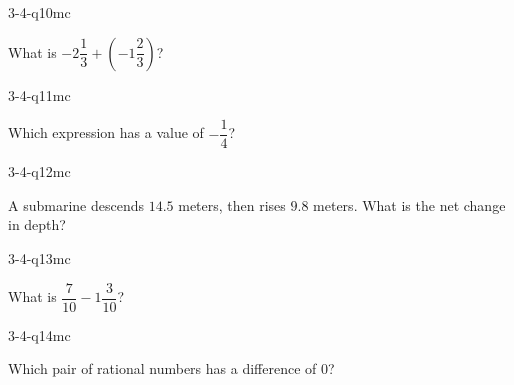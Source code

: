 \begin{practiceQuestion}{3-4-q10}{mc}
\begin{questionText}
What is $-2\dfrac{1}{3} + \left(-1\dfrac{2}{3}\right)$?
\end{questionText}
\end{practiceQuestion}

\begin{practiceQuestion}{3-4-q11}{mc}
\begin{questionText}
Which expression has a value of $-\dfrac{1}{4}$?
\end{questionText}
\end{practiceQuestion}

\begin{practiceQuestion}{3-4-q12}{mc}
\begin{questionText}
A submarine descends $14.5$ meters, then rises $9.8$ meters. What is the net change in depth?
\end{questionText}
\end{practiceQuestion}

\begin{practiceQuestion}{3-4-q13}{mc}
\begin{questionText}
What is $\dfrac{7}{10} - 1\dfrac{3}{10}$?
\end{questionText}
\end{practiceQuestion}

\begin{practiceQuestion}{3-4-q14}{mc}
\begin{questionText}
Which pair of rational numbers has a difference of $0$?
\end{questionText}
\end{practiceQuestion}

